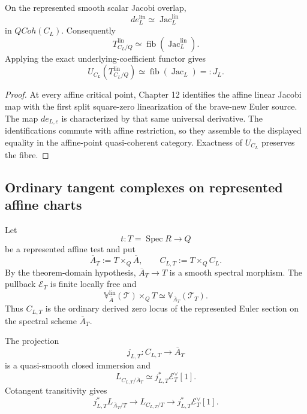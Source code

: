 \begin{theorem}
\label{thm:symmetry-noether-affine-point-jacobi-identification}
On the represented smooth scalar Jacobi overlap,
\[
de_L^{\mathrm{lin}}
\simeq
\operatorname{Jac}_L^{\mathrm{lin}}
\]
in $QCoh(C_L)$.  Consequently
\[
\boxed{
T_{C_L/Q}^{\mathrm{lin}}
\simeq
\operatorname{fib}
\left(
\operatorname{Jac}_L^{\mathrm{lin}}
\right).
}
\]
Applying the exact underlying-coefficient functor gives
\[
U_{C_L}
\left(
T_{C_L/Q}^{\mathrm{lin}}
\right)
\simeq
\operatorname{fib}(\operatorname{Jac}_L)
=:J_L.
\]
\end{theorem}

\begin{proof}
At every affine critical point, Chapter 12 identifies the affine linear Jacobi map
with the first split square-zero linearization of the brave-new Euler source.
The map $de_{L,c}$ is characterized by that same universal derivative.
The identifications commute with affine restriction, so they assemble to the
displayed equality in the affine-point quasi-coherent category.  Exactness of
$U_{C_L}$ preserves the fibre.
\end{proof}

\subsection{Ordinary tangent complexes on represented affine charts}
\label{subsec:symmetry-noether-ordinary-tangent-complexes-on-represented-affine-charts}

Let
\[
t:T=\operatorname{Spec}R\longrightarrow Q
\]
be a represented affine test and put
\[
\overline A_T:=T\times_Q\overline A,
\qquad
C_{L,T}:=T\times_QC_L.
\]
By the theorem-domain hypothesis,
$\overline A_T\to T$ is a smooth spectral morphism.  The pullback
$\mathcal E_T$ is finite locally free and
\[
\mathbb V_{\overline A}^{\mathrm{lin}}(\mathcal T)
\times_QT
\simeq
\mathbb V_{\overline A_T}(\mathcal T_T).
\]
Thus $C_{L,T}$ is the ordinary derived zero locus of the represented Euler section
on the spectral scheme $\overline A_T$.

\begin{proposition}
\label{prop:symmetry-noether-chartwise-quasi-smooth-euler-zero-locus}
The projection
\[
j_{L,T}:C_{L,T}\longrightarrow\overline A_T
\]
is a quasi-smooth closed immersion and
\[
L_{C_{L,T}/\overline A_T}
\simeq
j_{L,T}^*\mathcal E_T^\vee[1].
\]
Cotangent transitivity gives
\[
j_{L,T}^*L_{\overline A_T/T}
\longrightarrow
L_{C_{L,T}/T}
\longrightarrow
j_{L,T}^*\mathcal E_T^\vee[1].
\]
\end{proposition}

